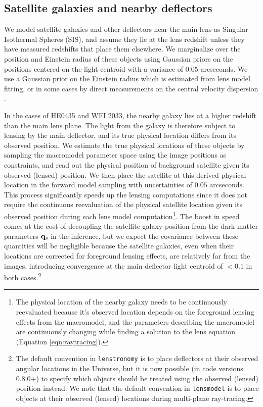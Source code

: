 \subsection{Satellite galaxies and nearby deflectors}
\label{ssec:satgals}
We model satellite galaxies and other deflectors near the main lens as Singular Isothermal Spheres (SIS), and assume they lie at the lens redshift unless they have measured redshifts that place them elsewhere. We marginalize over the position and Einstein radius of these objects using Gaussian priors on the positions centered on the light centroid with a variance of $0.05$ arcseconds. We use a Gaussian prior on the Einstein radius which is estimated from lens model fitting, or in some cases by direct measurements on the central velocity dispersion \citep[e.g.][]{Wong++17,Rusu++19}. 

In the cases of HE0435 and WFI 2033, the nearby galaxy lies at a higher redshift than the main lens plane. The light from the galaxy is therefore subject to lensing by the main deflector, and its true physical location differs from its observed position. We estimate the true physical locations of these objects by sampling the macromodel parameter space using the image positions as constraints, and read out the physical position of background satellite given its observed (lensed) position. We then place the satellite at this derived physical location in the forward model sampling with uncertainties of $0.05$ arcseconds. This process significantly speeds up the lensing computations since it does not require the continuous reevaluation of the physical satellite location given its observed position during each lens model computation\footnote{The physical location of the nearby galaxy needs to be continuously reevaluated because it's observed location depends on the foreground lensing effects from the macromodel, and the parameters describing the macromodel are continuously changing while finding a solution to the lens equation (Equation \ref{eqn:raytracing}).}. The boost in speed comes at the cost of decoupling the satellite galaxy position from the dark matter parameters ${\bf{q}_{\rm{s}}}$ in the inference, but we expect the covariance between these quantities will be negligible because the satellite galaxies, even when their locations are corrected for foreground lensing effects, are relatively far from the images, introducing convergence at the main deflector light centroid of $< 0.1$ in both cases.\footnote{The default convention in {\tt{lenstronomy}} is to place deflectors at their observed angular locations in the Universe, but it is now possible (in code versions 0.8.0+) to specify which objects should be treated using the observed (lensed) position instead. We note that the default convention in {\tt{lensmodel}} \citep{Keeton++97} is to place objects at their observed (lensed) locations during multi-plane ray-tracing.}


